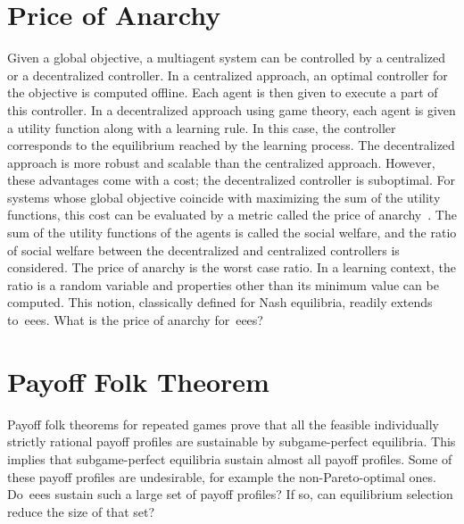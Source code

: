 \section{Price of Anarchy}
Given a global objective, a multiagent system can be controlled by a centralized or a decentralized controller.
In a centralized approach, an optimal controller for the objective is computed offline.
Each agent is then given to execute a part of this controller.
In a decentralized approach using game theory, each agent is given a utility function along with a learning rule.
In this case, the controller corresponds to the equilibrium reached by the learning process.
The decentralized approach is more robust and scalable than the centralized approach.
However, these advantages come with a cost; the decentralized controller is suboptimal.
For systems whose global objective coincide with maximizing the sum of the utility functions, this cost can be evaluated by a metric called the price of anarchy~\cite{koutsoupias_papadimitriou:1999}.
The sum of the utility functions of the agents is called the social welfare, and the ratio of social welfare between the decentralized and centralized controllers is considered.
The price of anarchy is the worst case ratio.
In a learning context, the ratio is a random variable and properties other than its minimum value can be computed.
This notion, classically defined for Nash equilibria, readily extends to~\acp{eee}.
What is the price of anarchy for~\acp{eee}?

\section{Payoff Folk Theorem}
Payoff folk theorems for repeated games prove that all the feasible individually strictly rational payoff profiles are sustainable by subgame-perfect equilibria.
This implies that subgame-perfect equilibria sustain almost all payoff profiles.
Some of these payoff profiles are undesirable, for example the non-Pareto-optimal ones.
Do~\acp{eee} sustain such a large set of payoff profiles?
If so, can equilibrium selection  reduce the size of that set?
